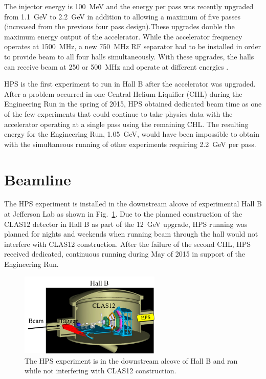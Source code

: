 \documentclass[12pt]{report}
\begin{document}
The injector energy is 100~MeV and the energy per pass was recently upgraded from 1.1~GeV to 2.2~GeV in addition to allowing a maximum of five passes (increased from the previous four pass design).These upgrades double the maximum energy output of the accelerator. While the accelerator frequency operates at 1500~MHz, a new 750~MHz RF separator had to be installed in order to provide beam to all four halls simultaneously. With these upgrades, the halls can receive beam at 250 or 500~MHz and operate at different energies \cite{kazimi}. 

HPS is the first experiment to run in Hall B after the accelerator was upgraded. After a problem occurred in one Central Helium Liquifier (CHL) during the Engineering Run in the spring of 2015, HPS obtained dedicated beam time as one of the few experiments that could continue to take physics data with the accelerator operating at a single pass using the remaining CHL. The resulting energy for the Engineering Run, 1.05~GeV, would have been impossible to obtain with the simultaneous running of other experiments requiring 2.2~GeV per pass.  

\section{Beamline}

The HPS experiment is installed in the downstream alcove of experimental Hall B at Jefferson Lab as shown in Fig.~\ref{Figure:hallB}. Due to the planned construction of the CLAS12 detector in Hall B as part of the 12~GeV upgrade, HPS running was planned for nights and weekends when running beam through the hall would not interfere with CLAS12 construction. After the failure of the second CHL, HPS received dedicated, continuous running during May of 2015 in support of the Engineering Run. 

\begin{figure}[H]
  \centering
      \includegraphics[width=0.6\textwidth]{pics/experiment/hallB.png}
  \caption[HPS location in Hall B]{The HPS experiment is in the downstream alcove of Hall B and ran while not interfering with CLAS12 construction.}
  \label{Figure:hallB}
\end{figure}
\end{document}
